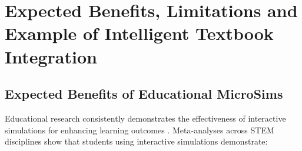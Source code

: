 \section{Expected Benefits, Limitations and Example of Intelligent Textbook Integration}
\label{sec:benefits}
\label{sec:limitations}

\subsection{Expected Benefits of Educational MicroSims}

Educational research consistently demonstrates the effectiveness of interactive simulations for enhancing learning outcomes \cite{wieman2008phet, rutten2012learning, dangelo2014simulations}. Meta-analyses across STEM disciplines show that students using interactive simulations demonstrate:

